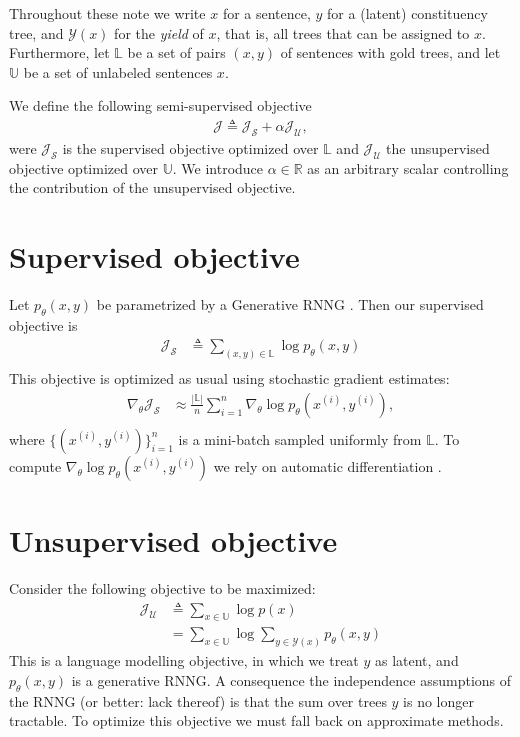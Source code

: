 
Throughout these note we write $x$ for a sentence, $y$ for a (latent) constituency tree, and $\mathcal{Y}(x)$ for the \textit{yield} of $x$, that is, all trees that can be assigned to $x$. Furthermore, let $\mathbb{L}$ be a set of pairs $(x, y)$ of sentences with gold trees, and let $\mathbb{U}$ be a set of unlabeled sentences $x$.

We define the following semi-supervised objective
\begin{align}
    \mathcal{J} \triangleq \mathcal{J}_{\mathcal{S}} + \alpha \mathcal{J}_{\mathcal{U}},
\end{align}
were $\mathcal{J}_{\mathcal{S}}$ is the supervised objective optimized over $\mathbb{L}$ and $\mathcal{J}_{\mathcal{U}}$ the unsupervised objective optimized over $\mathbb{U}$. We introduce $\alpha \in \mathbb{R}$ as an arbitrary scalar controlling the contribution of the unsupervised objective.

\section{Supervised objective}
Let $p_{\theta}(x,y)$ be parametrized by a Generative RNNG \citep{Dyer+2016:RNNG}. Then our supervised objective is
\begin{align}
    \mathcal{J}_{\mathcal{S}}
        &\triangleq \sum_{(x,y) \in \mathbb{L}} \log p_{\theta} (x, y) \\
\end{align}
This objective is optimized as usual using stochastic gradient estimates:
\begin{align}
    \nabla_{\theta} \mathcal{J}_{\mathcal{S}}
        &\approx \frac{|\mathbb{L}|}{n} \sum_{i=1}^n \nabla_{\theta} \log p_{\theta} (x^{(i)}, y^{(i)}), \\
\end{align}
where $\{(x^{(i)}, y^{(i)})\}_{i=1}^n$ is a mini-batch sampled uniformly from $\mathbb{L}$. To compute $\nabla_{\theta} \log p_{\theta}(x^{(i)}, y^{(i)})$ we rely on automatic differentiation \citep{Baydin+2015:AD}.

\section{Unsupervised objective}
Consider the following objective to be maximized:
\begin{subequations}
\begin{align}
    \mathcal{J}_{\mathcal{U}}
        &\triangleq \sum_{x \in \mathbb{U}} \log p (x) \\
        &= \sum_{x \in \mathbb{U}} \log \sum_{y \in \mathcal{Y}(x)} p_{\theta}(x, y)
\end{align}
\end{subequations}
This is a language modelling objective, in which we treat $y$ as latent, and $p_{\theta}(x,y)$ is a generative RNNG. A consequence the independence assumptions of the RNNG (or better: lack thereof) is that the sum over trees $y$ is no longer tractable.  To optimize this objective we must fall back on approximate methods.

